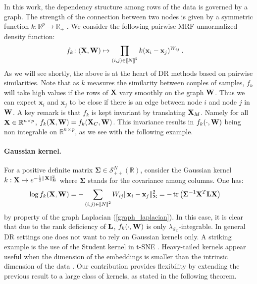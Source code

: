 In this work, the dependency structure among rows of the data is governed by a graph. The strength of the connection between two nodes is given by a symmetric function $k: \mathbb{R}^p \to \mathbb{R}_+$ . We consider the following pairwise MRF unnormalized density function:
\begin{align}\label{eq:unnormalized_MRF}
  f_{k} \colon (\mathbf{X},{\mathbf{W}}) &\mapsto \prod_{(i,j) \in {[\![N]\!]}^2} k(\mathbf{x}_{i} - \mathbf{x}_{j})^{W_{ij}} \: .
\end{align}
As we will see shortly, the above is at the heart of DR methods based on pairwise similarities. Note that as $k$ measures the similarity between couples of samples, $f_k$ will take high values if the rows of $\mathbf{X}$ vary smoothly on the graph ${\mathbf{W}}$. Thus we can expect $\mathbf{x}_i$ and $\mathbf{x}_j$ to be close if there is an edge between node $i$ and node $j$ in ${\mathbf{W}}$. A key remark is that $f_{k}$ is kept invariant by translating $\mathbf{X}_{M}$. Namely for all $\mathbf{X} \in \mathbb{R}^{n \times p}$, $f_{k}(\mathbf{X}, {\mathbf{W}}) = f_{k}(\mathbf{X}_{C}, {\mathbf{W}})$. This invariance results in $f_{k}(\cdot, {\mathbf{W}})$ being non integrable on $\mathbb{R}^{n \times p}$, as we see with the following example. 

\paragraph{Gaussian kernel.} For a positive definite matrix $\mathbf{\Sigma} \in \mathcal{S}^N_{++}(\mathbb{R})$, consider the Gaussian kernel $k : \mathbf{X} \mapsto e^{- \frac{1}{2}\| \mathbf{X} \|_{\mathbf{\Sigma}}^2}$ where $\mathbf{\Sigma}$ stands for the covariance among columns. One has:
\begin{align}\label{eq:gaussian_kernel}
    \log f_{k}(\mathbf{X}, {\mathbf{W}}) &= -\sum_{(i,j) \in {[\![N]\!]}^2} W_{ij} \| \mathbf{x}_{i}-\mathbf{x}_{j} \|^2_{\mathbf{\Sigma}}
    = - \operatorname{tr} \left(\mathbf{\Sigma}^{-1} \mathbf{X}^{T} \mathbf{L} \mathbf{X}\right)
\end{align}
by property of the graph Laplacian (\cref{graph_laplacian}). In this case, it is clear that due to the rank deficiency of $\mathbf{L}$, $f_{k}(\cdot, {\mathbf{W}})$ is only $\lambda_{\mathcal{S}_{C}}$-integrable. In general DR settings one does not want to rely on Gaussian kernels only. A striking example is the use of the Student kernel in t-SNE \citep{maaten2008tSNE}. Heavy-tailed kernels appear useful when the dimension of the embeddings is smaller than the intrinsic dimension of the data \citep{kobak2019heavy}. Our contribution provides flexibility by extending the previous result to a large class of kernels, as stated in the following theorem.

